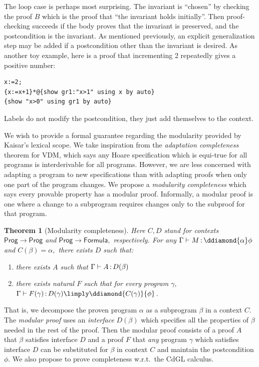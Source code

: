 \documentclass[12pt]{cmuthesis}
\newtheorem{theorem}{Theorem}
\theoremstyle{definition}
\theoremstyle{remark}
\newcommand{\CdGL}{\textsf{CdGL}\xspace}
\newcommand{\G}{\Gamma}
\begin{document}

The loop case is perhaps most surprising.
The invariant is ``chosen'' by checking the proof $B$ which is the proof that ``the invariant holds initially''.
Then proof-checking succeeds if the body proves that the invariant is preserved, and the postcondition is the invariant.
As mentioned previously, an explicit generalization step may be added if a postcondition other than the invariant is desired.
As another toy example, here is a proof that incrementing 2 repeatedly gives a positive number:
\begin{verbatim}
x:=2;
{x:=x+1}*@{show gr1:"x>1" using x by auto}
{show "x>0" using gr1 by auto}
\end{verbatim}

Labels do not modify the postcondition, they just add themselves to the context.

We wish to provide a formal guarantee regarding the modularity provided by Kaisar's lexical scope.
We take inspiration from the \emph{adaptation completeness}~\cite{DBLP:journals/fac/Kleymann99} theorem for VDM, which says any Hoare specification which is equi-true for all programs is interderivable for all programs.
However, we are less concerned with adapting a program to new specifications than with adapting proofs when only one part of the program changes.
We propose a \emph{modularity completeness} which says every provable property has a modular proof.
Informally, a modular proof is one where a change to a subprogram requires changes only to the subproof for that program.
\begin{theorem}[Modularity completeness]
  Here $C,D$ stand for contexts $\mathsf{Prog} \to \mathsf{Prog}$ and $\mathsf{Prog} \to \mathsf{Formula},$ respectively.
  For any $\proves{\G}{M}{\ddiamond{\alpha}}{\phi}$ and $C(\beta) = \alpha,$ there exists $D$ such that:
\begin{enumerate}
\item there exists $A$ such that $\proves{\G}{A}{D(\beta)}$
\item there exists natural $F$ such that for every program $\gamma,$ $\proves{\G}{F(\gamma)}{D(\gamma) \limply \ddiamond{C(\gamma)}{\phi}}$.
\end{enumerate}
\end{theorem}
That is, we decompose the proven program $\alpha$ as a subprogram $\beta$ in a context $C$.
The \emph{modular proof} uses an \emph{interface} $D(\beta)$ which specifies all the properties of $\beta$ needed in the rest of the proof.
Then the modular proof consists of a proof $A$ that $\beta$ satisfies interface $D$ and a proof $F$ that \emph{any} program $\gamma$ which satisfies interface $D$ can be substituted for $\beta$ in context $C$ and maintain the postcondition $\phi$.
We also propose to prove completeness w.r.t.\ the \CdGL calculus.
\end{document}
